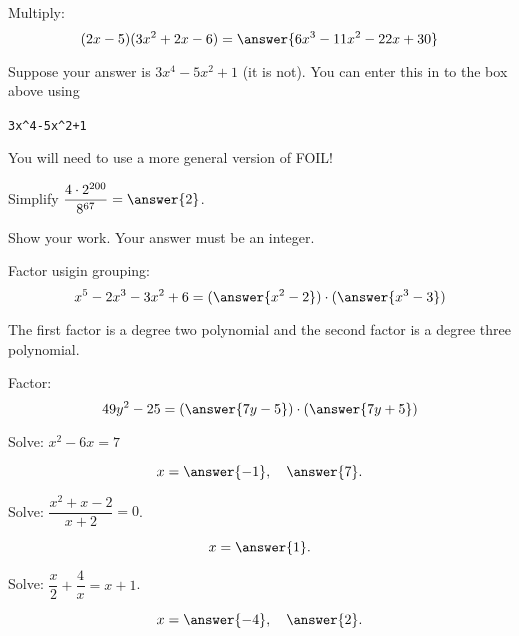 \documentclass{ximera}
\begin{document}
\begin{problem}

Multiply: \hspace{1 cm} 
$$(2x -5)(3x^2 +2x -6)
=
\answer{6x^3-11x^2-22x+30}$$

\begin{hint}
\item Suppose your answer is $3x^4-5x^2+1$ (it is not). You can enter this in to the box above using

\hfill 
\verb|3x^4-5x^2+1|
\hfill \,
\item You will need to use a more general version of FOIL!
\end{hint}



\end{problem}



\begin{problem}

Simplify $\dfrac{4\cdot 2^{200}}{8^{67}}=\answer{2}$.

Show your work. Your answer must be an integer. \\ 



\end{problem}



\begin{problem}

Factor usigin grouping:  
$$x^5 - 2 x^3 - 3x^2 +6
=
(\answer{x^2-2})\cdot(\answer{x^3-3})$$

The first factor is a degree two polynomial and the second factor is a degree three polynomial.


\end{problem}



\begin{problem}

Factor: 
$$49y^2 - 25
=
(\answer{7y-5})\cdot (\answer{7y+5})$$

\end{problem}



\begin{problem}

Solve: \hspace{1cm} $x^2 - 6x = 7$

$$x=\answer{-1},~~~ \answer{7}.$$


\end{problem}



\begin{problem}

Solve: \hspace{1cm} $\dfrac{x^2+x-2}{x+2}= 0$.


$$x=\answer{1}.$$
\end{problem}



\begin{problem}
Solve: \hspace{1cm} $\dfrac{x}{2}+\dfrac{4}{x}= x+1$.

$$x=\answer{-4}, ~~~ \answer{2}.$$

\end{problem}
\end{document}
